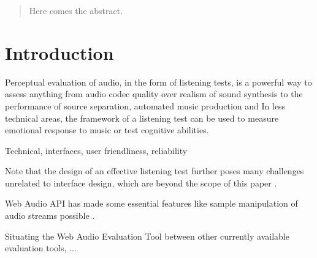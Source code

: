 \documentclass{sig-alternate}
\begin{document}
\maketitle
\begin{abstract}
Here comes the abstract. 
\end{abstract}


\section{Introduction}

	Perceptual evaluation of audio, in the form of listening tests, is a powerful way to assess anything from audio codec quality over realism of sound synthesis to the performance of source separation, automated music production and 
	In less technical areas, the framework of a listening test can be used to measure emotional response to music or test cognitive abilities. %


	Technical, interfaces, user friendliness, reliability 

	Note that the design of an effective listening test further poses many challenges unrelated to interface design, which are beyond the scope of this paper \cite{bech}. 

	Web Audio API has made some essential features like sample manipulation of audio streams possible \cite{schoeffler2015mushra}.
	
	Situating the Web Audio Evaluation Tool between other currently available evaluation tools, ...
	
\end{document}
